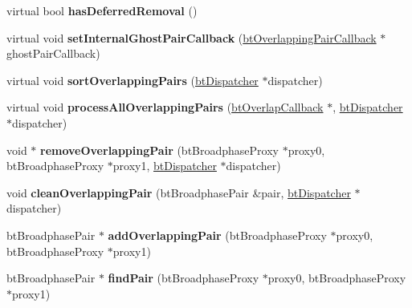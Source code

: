 \begin{DoxyCompactItemize}
virtual bool {\bfseries has\+Deferred\+Removal} ()
\item 
\mbox{\label{classbtSortedOverlappingPairCache_a15ec25362baaa8e2eaad2a0f3c04aaa5}} 
virtual void {\bfseries set\+Internal\+Ghost\+Pair\+Callback} (\hyperlink{classbtOverlappingPairCallback}{bt\+Overlapping\+Pair\+Callback} $\ast$ghost\+Pair\+Callback)
\item 
\mbox{\label{classbtSortedOverlappingPairCache_ae58a25664f2ff3bd29836c2d13abcb24}} 
virtual void {\bfseries sort\+Overlapping\+Pairs} (\hyperlink{classbtDispatcher}{bt\+Dispatcher} $\ast$dispatcher)
\item 
\mbox{\label{classbtSortedOverlappingPairCache_a9d725360ec7f2a252aa71c7806ccf4d4}} 
virtual void {\bfseries process\+All\+Overlapping\+Pairs} (\hyperlink{structbtOverlapCallback}{bt\+Overlap\+Callback} $\ast$, \hyperlink{classbtDispatcher}{bt\+Dispatcher} $\ast$dispatcher)
\item 
\mbox{\label{classbtSortedOverlappingPairCache_a594a3f569a36aa60abcc6e1d00da421e}} 
void $\ast$ {\bfseries remove\+Overlapping\+Pair} (bt\+Broadphase\+Proxy $\ast$proxy0, bt\+Broadphase\+Proxy $\ast$proxy1, \hyperlink{classbtDispatcher}{bt\+Dispatcher} $\ast$dispatcher)
\item 
\mbox{\label{classbtSortedOverlappingPairCache_a93515a9a3bc255484af4024b802bee0d}} 
void {\bfseries clean\+Overlapping\+Pair} (bt\+Broadphase\+Pair \&pair, \hyperlink{classbtDispatcher}{bt\+Dispatcher} $\ast$dispatcher)
\item 
\mbox{\label{classbtSortedOverlappingPairCache_adac2e952e363f1dd7761daabb6937230}} 
bt\+Broadphase\+Pair $\ast$ {\bfseries add\+Overlapping\+Pair} (bt\+Broadphase\+Proxy $\ast$proxy0, bt\+Broadphase\+Proxy $\ast$proxy1)
\item 
\mbox{\label{classbtSortedOverlappingPairCache_a226b0b770b5772a80620729563ac87cf}} 
bt\+Broadphase\+Pair $\ast$ {\bfseries find\+Pair} (bt\+Broadphase\+Proxy $\ast$proxy0, bt\+Broadphase\+Proxy $\ast$proxy1)
\item 

\end{DoxyCompactItemize}
